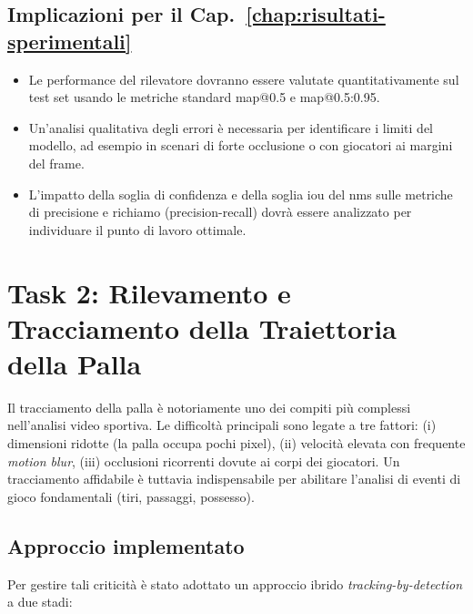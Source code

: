 \documentclass[12pt,a4paper,openright,twoside]{book}
\begin{document}
\subsection*{Implicazioni per il Cap.~\ref{chap:risultati-sperimentali}}

\begin{itemize}
  \item Le performance del rilevatore dovranno essere valutate 
  quantitativamente sul test set usando le metriche standard 
  \ac{map}@0.5 e \ac{map}@0.5:0.95.
  \item Un'analisi qualitativa degli errori è necessaria per 
  identificare i limiti del modello, ad esempio in scenari di 
  forte occlusione o con giocatori ai margini del frame.
  \item L'impatto della soglia di confidenza e della soglia 
  \ac{iou} del \ac{nms} sulle metriche di precisione e 
  richiamo (precision-recall) dovrà essere analizzato per 
  individuare il punto di lavoro ottimale.
\end{itemize}

\section{Task 2: Rilevamento e Tracciamento della Traiettoria della Palla}
\label{sec:task-2}

Il tracciamento della palla è notoriamente uno dei compiti più 
complessi nell'analisi video sportiva. Le difficoltà principali sono 
legate a tre fattori: (i) dimensioni ridotte (la palla occupa 
pochi pixel), (ii) velocità elevata con frequente \emph{motion blur}, 
(iii) occlusioni ricorrenti dovute ai corpi dei giocatori.
Un tracciamento affidabile è tuttavia indispensabile per abilitare 
l'analisi di eventi di gioco fondamentali (tiri, passaggi, possesso).

\subsection{Approccio implementato}
\label{subsec:approccio-implementato-palla}

Per gestire tali criticità è stato adottato un approccio ibrido 
\emph{tracking-by-detection} a due stadi:
\end{document}
